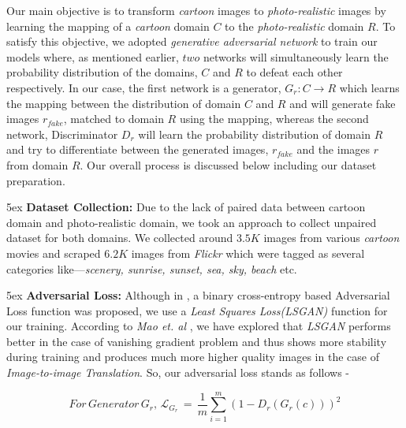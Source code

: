 \documentclass[conference]{IEEEtran}
\begin{document}
Our main objective is to transform \textit{cartoon} images to \textit{photo-realistic} images by learning the mapping of a \textit{cartoon} domain $C$ to the \textit{photo-realistic} domain $R$. To satisfy this objective, we adopted \textit{generative adversarial network}\cite{DBLP:conf/nips/GoodfellowPMXWOCB14} to train our models where, as mentioned earlier, $two$ networks will simultaneously learn the probability distribution of the domains, $C$ and $R$ to defeat each other respectively. In our case, the first network is a generator, $G_r: C\rightarrow R$ which learns the mapping between the distribution of domain $C$ and $R$ and will generate fake images $r_{fake}$, matched to domain $R$ using the mapping, whereas the second network,  Discriminator $D_r$ will learn the probability distribution of domain $R$ and try to differentiate between the generated images, $r_{fake}$ and the images $r$ from domain $R$. Our overall process is discussed below including our dataset preparation.

\parindent 5ex \textbf{Dataset Collection:} Due to the lack of paired data between {cartoon} domain and {photo-realistic} domain, we took an approach to collect unpaired dataset for both domains. We collected around $3.5K$ images from various \textit{cartoon} movies and scraped $6.2K$ images from \textit{Flickr} which were tagged as several categories like---\textit{scenery, sunrise, sunset, sea, sky, beach} etc. 

\parindent 5ex \textbf{Adversarial Loss:} Although in
\cite{DBLP:conf/nips/GoodfellowPMXWOCB14}, a binary cross-entropy based Adversarial Loss function was proposed, we use a \textit{Least Squares Loss(LSGAN)} function for our training. According to \textit{Mao et. al} \cite{DBLP:conf/iccv/MaoLXLWS17}, we have explored that \textit{LSGAN} performs better in the case of vanishing gradient problem and thus shows more stability during training and produces much more higher quality images in the case of \textit{Image-to-image Translation}. So, our adversarial loss stands as follows - 

\begin{equation}
For\, Generator\, G_r,\, \mathcal{L}_{G_r}\, =\, \frac{1}{m}\sum^m_{i=1}(1-D_r(G_r(c)))^2
\end{equation}
\end{document}
